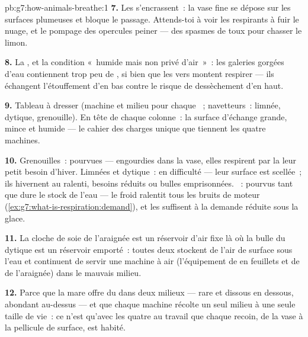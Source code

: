 \begin{solution}{pb:g7:how-animals-breathe:1}
\textbf{7.} Les  s'encrassent~: la vase fine se dépose sur
les surfaces plumeuses et bloque le passage. Attends-toi à voir les
respirants à  fuir le nuage, et le pompage des opercules
peiner --- des spasmes de toux pour chasser le limon.

\textbf{8.} La , et la condition «~humide mais
non privé d'air~»~: les galeries gorgées d'eau contiennent trop peu
de , si bien que les vers montent respirer --- ils
échangent l'étouffement d'en bas contre le risque de dessèchement
d'en haut.

\textbf{9.} Tableau à dresser (machine et milieu pour chaque
~; navetteurs~: limnée, dytique, grenouille). En tête de
chaque colonne~: la surface d'échange grande, mince et humide --- le
cahier des charges unique que tiennent les quatre machines.

\textbf{10.} Grenouilles~: pourvues --- engourdies dans la vase,
elles respirent par la  leur petit besoin d'hiver. Limnées et
dytique~: en difficulté --- leur surface est scellée~; ils hivernent
au ralenti, besoins réduits ou bulles emprisonnées. ~:
pourvus tant que dure le stock de l'eau --- le froid ralentit tous
les bruits de moteur
(\cref{ex:g7:what-is-respiration:demand}), et les 
suffisent à la demande réduite sous la glace.

\textbf{11.} La cloche de soie de l'araignée est un réservoir d'air
fixe là où la bulle du dytique est un réservoir emporté~: toutes
deux stockent de l'air de surface sous l'eau et continuent de servir
une machine à air (l'équipement de  en feuillets et de
 de l'araignée) dans le mauvais milieu.

\textbf{12.} Parce que la mare offre du  dans deux milieux
--- rare et dissous en dessous, abondant au-dessus --- et que chaque
machine récolte un seul milieu à une seule taille de vie~: ce n'est
qu'avec les quatre au travail que chaque recoin, de la vase à la
pellicule de surface, est habité.
\end{solution}
